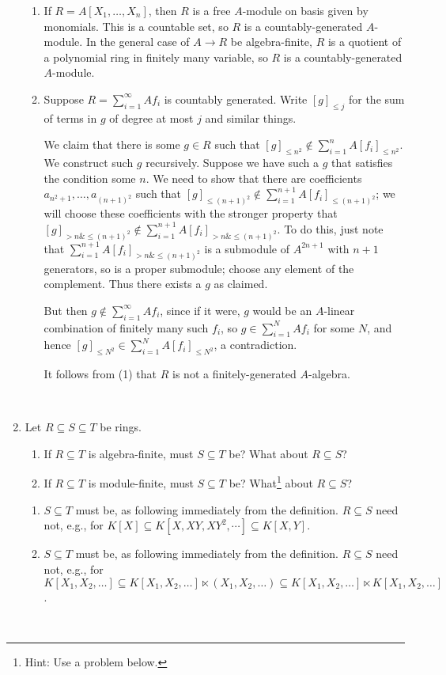 \documentclass[12pt]{amsart}
\newcommand{\solution}[1]{\ifthenelse {\equal{\displaysol}{1}} {\begin{framed}{\color{meretale}\noindent #1}\end{framed}} { \ }}
\newcommand\itemB{\stepcounter{enumi}\item[(\theenumi)]}
\newcommand\itemb{\stepcounter{enumii}\item[(\theenumii)]}
\begin{document}
\begin{enumerate}
\begin{samepage}
\begin{enumerate}
\end{enumerate}
\end{samepage}

\solution{
\begin{enumerate}
\itemb If $R = A[X_1,\dots,X_n]$, then $R$ is a free $A$-module on basis given by monomials. This is a countable set, so $R$ is a countably-generated $A$-module. In the general case of $A\to R$ be algebra-finite, $R$ is a quotient of a polynomial ring in finitely many variable, so $R$ is a countably-generated $A$-module.

\itemb Suppose $R = \sum_{i=1}^\infty A f_i$ is countably generated. Write $[g]_{\leq j}$ for the sum of terms in $g$ of degree at most $j$ and similar things. 

We claim that there is some $g\in R$ such that $[g]_{\leq n^2} \notin \sum_{i=1}^n A [f_i]_{\leq n^2}$. We construct such $g$ recursively. Suppose we have such a $g$ that satisfies the condition some $n$. We need to show that there are coefficients $a_{{n^2+1}}, \dots, a_{(n+1)^2}$ such that $[g]_{\leq (n+1)^2} \notin \sum_{i=1}^{n+1} A [f_i]_{\leq (n+1)^2}$; we will choose these coefficients with the stronger property that $[g]_{>n \& \leq (n+1)^2} \notin \sum_{i=1}^{n+1} A [f_i]_{>n \& \leq (n+1)^2}$. To do this, just note that $\sum_{i=1}^{n+1} A [f_i]_{>n \& \leq (n+1)^2}$ is a submodule of $A^{2n+1}$ with $n+1$ generators, so is a proper submodule; choose any element of the complement. Thus there exists a $g$ as claimed.

But then $g\notin \sum_{i=1}^\infty A f_i$, since if it were, $g$ would be an $A$-linear combination of finitely many such $f_i$, so $g\in \sum_{i=1}^N A f_i$ for some $N$, and hence $[g]_{\leq N^2} \in \sum_{i=1}^N A [f_i]_{\leq N^2}$, a contradiction.

It follows from (1) that $R$ is not a finitely-generated $A$-algebra.
\end{enumerate}}


\itemB Let $R\subseteq S \subseteq T$ be rings.
\begin{enumerate}
\itemb If $R\subseteq T$ is algebra-finite, must $S\subseteq T$ be? What about $R\subseteq S$?
\itemb If $R\subseteq T$ is module-finite, must $S\subseteq T$ be? What\footnote{Hint: Use a problem below.} about $R\subseteq S$?
\end{enumerate}
\solution{
\begin{enumerate}
\itemb $S\subseteq T$ must be, as following immediately from the definition. $R\subseteq S$ need not, e.g., for $K[X] \subseteq K[X,XY,XY^2,\cdots] \subseteq K[X,Y]$.
\itemb $S\subseteq T$ must be, as following immediately from the definition. $R\subseteq S$ need not, e.g., for $K[X_1,X_2,\dots] \subseteq K[X_1,X_2,\dots] \ltimes (X_1,X_2,\dots) \subseteq  K[X_1,X_2,\dots] \ltimes K[X_1,X_2,\dots]$.
\end{enumerate}}


\end{enumerate}
\end{document}
